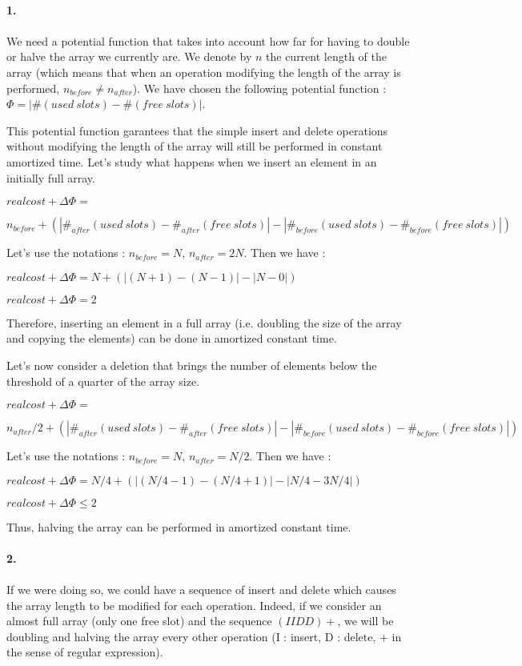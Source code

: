 \paragraph{1.}

\paragraph{}
We need a potential function that takes into account how far for having to double or halve the array we currently are. We denote by $n$ the current length of the array (which means that when an operation modifying the length of the array is performed, $n_{before} \neq n_{after}$). We have chosen the following potential function : $\Phi =  |\# (used\ slots) - \# (free\ slots)|$.

This potential function garantees that the simple insert and delete operations without modifying the length of the array will still be performed in constant amortized time. Let's study what happens when we insert an element in an initially full array.

$real cost + \Delta\Phi =$

$ n_{before}  +(|\#_{after} (used\ slots)-\#_{after} (free\ slots)|-|\#_{before} (used\ slots)-\#_{before} (free\ slots)|)$

Let's use the notations : $n_{before} = N$, $n_{after} = 2N$. Then we have :

$real cost + \Delta\Phi = N +(|(N+1)-(N-1)|-|N-0|)$

$real cost + \Delta\Phi = 2$

Therefore, inserting an element in a full array (i.e. doubling the size of the array and copying the elements) can be done in amortized constant time.

Let's now consider a deletion that brings the number of elements below the threshold of a quarter of the array size.

$real cost + \Delta\Phi =$

$ n_{after}/2  +(|\#_{after} (used\ slots)-\#_{after} (free\ slots)|-|\#_{before} (used\ slots)-\#_{before} (free\ slots)|)$


Let's use the notations : $n_{before} = N$, $n_{after} = N/2$. Then we have :

$real cost + \Delta\Phi = N/4+ (|(N/4-1)-(N/4+1)|-|N/4-3N/4|)$

$real cost + \Delta\Phi \leqslant 2 $

Thus, halving the array can be performed in amortized constant time.

\paragraph{2.}

\paragraph{}

If we were doing so, we could have a sequence of insert and delete which causes the array length to be modified for each operation. Indeed, if we consider an almost full array (only one free slot) and the sequence  $(IIDD)+$, we will be doubling and halving the array every other operation (I : insert, D : delete, + in the sense of regular expression).
